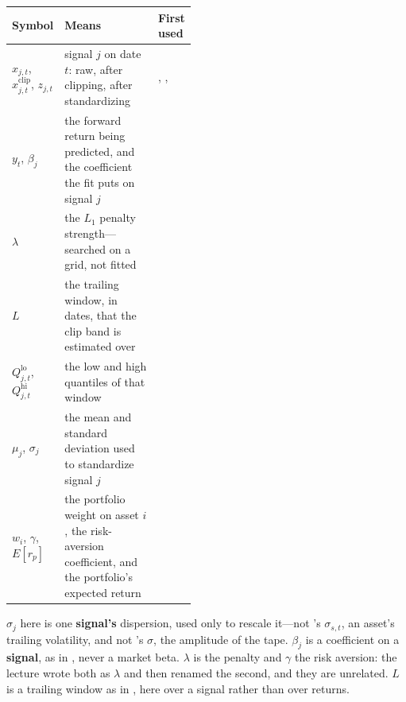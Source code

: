 \begin{xltabular}{\linewidth}{|>{\raggedright\arraybackslash}p{0.26\linewidth}|X|>{\raggedright\arraybackslash}p{0.20\linewidth}|}
\hline
\textbf{Symbol} & \textbf{Means} & \textbf{First used} \\ \hline
\endhead
$x_{j,t}$, $x^{\text{clip}}_{j,t}$, $z_{j,t}$
  & signal $j$ on date $t$: raw, after clipping, after standardizing
  & , ,  \\ \hline
$y_t$, $\beta_j$
  & the forward return being predicted, and the coefficient the fit puts on signal $j$
  &  \\ \hline
$\lambda$
  & the $L_1$ penalty strength---searched on a grid, not fitted
  &  \\ \hline
$L$
  & the trailing window, in dates, that the clip band is estimated over
  &  \\ \hline
$Q^{\text{lo}}_{j,t}$, $Q^{\text{hi}}_{j,t}$
  & the low and high quantiles of that window
  &  \\ \hline
$\mu_j$, $\sigma_j$
  & the mean and standard deviation used to standardize signal $j$
  &  \\ \hline
$w_i$, $\gamma$, $E[r_p]$
  & the portfolio weight on asset $i$, the risk-aversion coefficient, and the portfolio's expected
    return
  &  \\ \hline
\end{xltabular}

\begin{note}
$\sigma_j$ here is one \textbf{signal's} dispersion, used only to rescale it---not
's $\sigma_{s,t}$, an asset's trailing volatility,
and not 's $\sigma$, the amplitude of the tape.
$\beta_j$ is a coefficient on a \textbf{signal}, as in
, never a market beta. $\lambda$ is the penalty
and $\gamma$ the risk aversion: the lecture wrote both as $\lambda$ and then renamed the second,
and they are unrelated. $L$ is a trailing window as in
, here over a signal rather than over returns.
\end{note}
